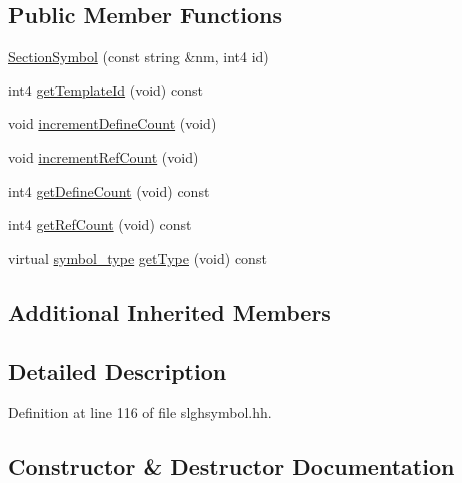 \subsection*{Public Member Functions}
\begin{DoxyCompactItemize}
\item 
\mbox{\hyperlink{class_section_symbol_a2b996c7586c171b88f5f9672cd05e60a}{Section\+Symbol}} (const string \&nm, int4 id)
\item 
int4 \mbox{\hyperlink{class_section_symbol_ad0bc8150af50f0cc022d60b276b5d177}{get\+Template\+Id}} (void) const
\item 
void \mbox{\hyperlink{class_section_symbol_ab6186568cb2d9a9e5b4386657eef0fda}{increment\+Define\+Count}} (void)
\item 
void \mbox{\hyperlink{class_section_symbol_a5ea9f041ee89fea2d9d99fa80d10e914}{increment\+Ref\+Count}} (void)
\item 
int4 \mbox{\hyperlink{class_section_symbol_a4b5c352a6912f02788d6933ff921be84}{get\+Define\+Count}} (void) const
\item 
int4 \mbox{\hyperlink{class_section_symbol_a08815eb5d006d9f872f647498943501e}{get\+Ref\+Count}} (void) const
\item 
virtual \mbox{\hyperlink{class_sleigh_symbol_aba70f7f332fd63488c5ec4bd7807db41}{symbol\+\_\+type}} \mbox{\hyperlink{class_section_symbol_a936ccdd0a97a5ca046d97cf66fbb4c83}{get\+Type}} (void) const
\end{DoxyCompactItemize}
\subsection*{Additional Inherited Members}


\subsection{Detailed Description}


Definition at line 116 of file slghsymbol.\+hh.



\subsection{Constructor \& Destructor Documentation}
\mbox{\label{class_section_symbol_a2b996c7586c171b88f5f9672cd05e60a}} 
